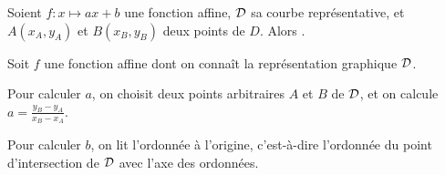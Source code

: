 \documentclass[11pt]{article}
\begin{document}
\begin{propriete}
  Soient $f:x\mapsto ax+b$ une fonction affine, $\cal D$ sa courbe
  représentative, et $A(x_A,y_A)$ et $B(x_B,y_B)$ deux points de $D$. Alors
  .
\end{propriete}

\begin{methode} Soit $f$ une fonction affine dont on connaît la représentation graphique $\cal D$.

  Pour calculer $a$, on choisit deux points arbitraires $A$ et $B$ de $\cal
  D$, et on calcule $a=\frac{y_B-y_A}{x_B-x_A}$.

  Pour calculer $b$, on lit l'ordonnée à l'origine, c'est-à-dire l'ordonnée
  du point d'intersection de $\cal D$ avec l'axe des ordonnées.
\end{methode}
\end{document}
